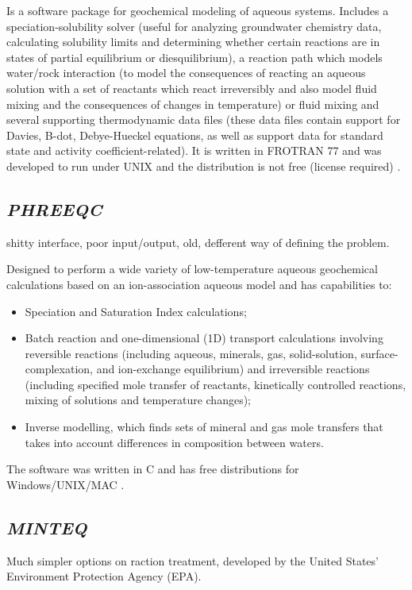 \documentclass[ppgc,mestrado,english]{iiufrgs}
\begin{document}
Is a software package for geochemical modeling of aqueous systems. Includes a speciation-solubility solver (useful for analyzing groundwater chemistry data, calculating solubility limits and determining whether certain reactions are in states of partial equilibrium or diesquilibrium), a reaction path which models water/rock interaction (to model the consequences of reacting an aqueous solution with a set of reactants which react irreversibly and also model fluid mixing and the consequences of changes in temperature) or fluid mixing and several supporting thermodynamic data files (these data files contain support for Davies, B-dot, Debye-Hueckel equations, as well as support data for standard state and activity coefficient-related). It is written in FROTRAN 77 and was developed to run under UNIX and the distribution is not free (license required) \cite{Wolery:79} \cite{Wolery:90} \cite{Wolery:92}.

\subsection{\emph{PHREEQC}}
shitty interface, poor input/output, old, defferent way of defining the problem.

Designed to perform a wide variety of low-temperature aqueous geochemical calculations based on an ion-association aqueous model and has capabilities to:
\begin{itemize}
\item Speciation and Saturation Index calculations;
\item Batch reaction and one-dimensional (1D) transport calculations involving reversible reactions (including aqueous, minerals, gas, solid-solution, surface-complexation, and ion-exchange equilibrium) and irreversible reactions (including specified mole transfer of reactants, kinetically controlled reactions, mixing of solutions and temperature changes);
\item Inverse modelling, which finds sets of mineral and gas mole transfers that takes into account differences in composition between waters.
\end{itemize}
The software was written in C and has free distributions for Windows/UNIX/MAC \cite{Parkhurst:80}.

\subsection{\emph{MINTEQ}}
Much simpler options on raction treatment, developed by the United States' Environment Protection Agency (EPA). 
\end{document}
